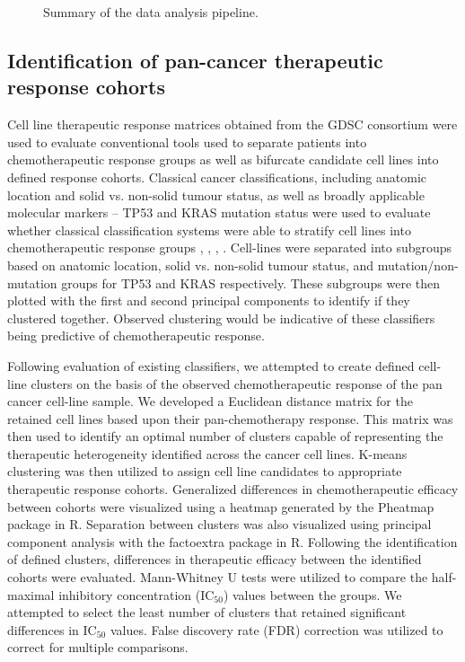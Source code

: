 \documentclass[10pt, letterpaper]{article}
\begin{document}
\begin{multicols}{2}
\begin{figure}[!ht]
    \caption{Summary of the data analysis pipeline.}
    \label{fig:pipeline}
\end{figure}


\subsection*{Identification of pan-cancer therapeutic response cohorts}
Cell line therapeutic response matrices obtained from the GDSC consortium were used to evaluate conventional tools used to separate patients into chemotherapeutic response groups as well as bifurcate candidate cell lines into defined response cohorts. Classical cancer classifications, including anatomic location and solid vs. non-solid tumour status, as well as broadly applicable molecular markers -- TP53 and KRAS mutation status were used to evaluate whether classical classification systems were able to stratify cell lines into chemotherapeutic response groups \cite{colorectal}, \cite{gi}, \cite{lung}, \cite{breast}. Cell-lines were separated into subgroups based on anatomic location, solid vs. non-solid tumour status, and mutation/non-mutation groups for TP53 and KRAS respectively. These subgroups were then plotted with the first and second principal components to identify if they clustered together. Observed clustering would be indicative of these classifiers being predictive of chemotherapeutic response. 

Following evaluation of existing classifiers, we attempted to create defined cell-line clusters on the basis of the observed chemotherapeutic response of the pan cancer cell-line sample. We developed a Euclidean distance matrix for the retained cell lines based upon their pan-chemotherapy response. This matrix was then used to identify an optimal number of clusters capable of representing the therapeutic heterogeneity identified across the cancer cell lines. K-means clustering was then utilized to assign cell line candidates to appropriate therapeutic response cohorts. Generalized differences in chemotherapeutic efficacy between cohorts were visualized using a heatmap generated by the Pheatmap package in R. Separation between clusters was also visualized using principal component analysis with the factoextra package in R. Following the identification of defined clusters, differences in therapeutic efficacy between the identified cohorts were evaluated. Mann-Whitney U tests were utilized to compare the half-maximal inhibitory concentration (IC$_{50}$) values between the groups. We attempted to select the least number of clusters that retained significant differences in IC$_{50}$ values. False discovery rate (FDR) correction was utilized to correct for multiple comparisons.



\end{multicols}
\end{document}
